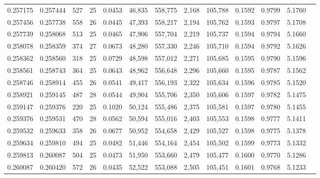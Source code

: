 \begin{tabular}{rrrrrrrrrrrrr}
0.257175 & 0.257444 &   527 &  25 &                                     0.0453 &  46,835 & 558,775 &   2,168 & 105,788 & 0.1592 & 0.9799 & 5.1760 \\
0.257456 & 0.257738 &   558 &  26 &                                     0.0445 &  47,393 & 558,217 &   2,194 & 105,762 & 0.1593 & 0.9797 & 5.1708 \\
0.257739 & 0.258068 &   513 &  25 &                                     0.0465 &  47,906 & 557,704 &   2,219 & 105,737 & 0.1594 & 0.9794 & 5.1660 \\
0.258078 & 0.258359 &   374 &  27 &                                     0.0673 &  48,280 & 557,330 &   2,246 & 105,710 & 0.1594 & 0.9792 & 5.1626 \\
0.258362 & 0.258560 &   318 &  25 &                                     0.0729 &  48,598 & 557,012 &   2,271 & 105,685 & 0.1595 & 0.9790 & 5.1596 \\
0.258561 & 0.258743 &   364 &  25 &                                     0.0643 &  48,962 & 556,648 &   2,296 & 105,660 & 0.1595 & 0.9787 & 5.1562 \\
0.258746 & 0.258914 &   455 &  26 &                                     0.0541 &  49,417 & 556,193 &   2,322 & 105,634 & 0.1596 & 0.9785 & 5.1520 \\
0.258921 & 0.259145 &   487 &  28 &                                     0.0544 &  49,904 & 555,706 &   2,350 & 105,606 & 0.1597 & 0.9782 & 5.1475 \\
0.259147 & 0.259376 &   220 &  25 &                                     0.1020 &  50,124 & 555,486 &   2,375 & 105,581 & 0.1597 & 0.9780 & 5.1455 \\
0.259376 & 0.259531 &   470 &  28 &                                     0.0562 &  50,594 & 555,016 &   2,403 & 105,553 & 0.1598 & 0.9777 & 5.1411 \\
0.259532 & 0.259633 &   358 &  26 &                                     0.0677 &  50,952 & 554,658 &   2,429 & 105,527 & 0.1598 & 0.9775 & 5.1378 \\
0.259634 & 0.259810 &   494 &  25 &                                     0.0482 &  51,446 & 554,164 &   2,454 & 105,502 & 0.1599 & 0.9773 & 5.1332 \\
0.259813 & 0.260087 &   504 &  25 &                                     0.0473 &  51,950 & 553,660 &   2,479 & 105,477 & 0.1600 & 0.9770 & 5.1286 \\
0.260087 & 0.260420 &   572 &  26 &                                     0.0435 &  52,522 & 553,088 &   2,505 & 105,451 & 0.1601 & 0.9768 & 5.1233 \\

\end{tabular}
